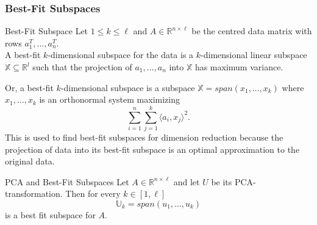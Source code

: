 \documentclass[english]{panikzettel}
\begin{document}
\subsubsection{Best-Fit Subspaces}
\begin{defi}{Best-Fit Subspace}
Let $1\leq k\leq \ell$ and $A\in\mathbb{R}^{n\times\ell}$ be the centred data matrix with rows $a_1^T,...,a_n^T$.\\
A best-fit $k$-dimensional subspace for the data is a $k$-dimensional linear subspace $\mathbb{X} \subseteq \mathbb{R}^l$ such that the projection of $a_1,...,a_n$ into $\mathbb{X}$ has maximum variance.
\end{defi}

\begin{halfboxl}
	\vspace{-\baselineskip}
	Or, a best-fit $k$-dimensional subspace is a subspace $\mathbb{X} = span(x_1,...,x_k)$ where $x_1,...,x_k$ is an orthonormal system maximizing
	\[
	\sum_{i=1}^n\sum_{j=1}^k \langle a_i, x_j\rangle^2.
	\]
	This is used to find best-fit subspaces for dimension reduction because the projection of data into its best-fit subspace is an optimal approximation to the original data.
\end{halfboxl}
\begin{halfboxr}
	\vspace{-\baselineskip}
	\begin{theo}{PCA and Best-Fit Subspaces}
	Let $A\in\mathbb{R}^{n\times \ell}$ and let $U$ be its PCA-transformation. Then for every $k\in [1,\ell]$
	\[
	\mathbb{U}_k=span(u_1,...,u_k)
	\]
	is a best fit subspace for $A$.
	\end{theo}
\end{halfboxr}

\end{document}
